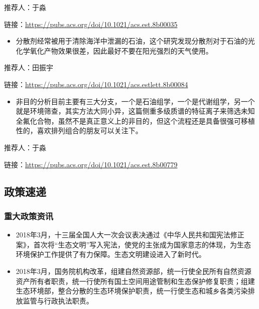 \documentclass[
]{book}
\providecommand{\tightlist}{%
  \setlength{\itemsep}{0pt}\setlength{\parskip}{0pt}}
\begin{document}
推荐人：于淼

链接：\url{https://pubs.acs.org/doi/10.1021/acs.est.8b00035}

\begin{itemize}
\tightlist
\item
  分散剂经常被用于清除海洋中泄漏的石油，这个研究发现分散剂对于石油的光化学氧化产物效果很差，因此最好不要在阳光强烈的天气使用。
\end{itemize}

推荐人：田振宇

链接：\url{https://pubs.acs.org/doi/10.1021/acs.estlett.8b00084}

\begin{itemize}
\tightlist
\item
  非目的分析目前主要有三大分支，一个是石油组学，一个是代谢组学，另一个就是环境筛查，其实方法大同小异，这篇侧重多级质谱的特征离子来筛选未知全氟化合物，虽然不是真正意义上的非目的，但这个流程还是具备很强可移植性的，喜欢排列组合的朋友可以关注下。
\end{itemize}

推荐人：于淼

链接：\url{https://pubs.acs.org/doi/10.1021/acs.est.8b00779}

\hypertarget{ux653fux7b56ux901fux9012}{%
\subsection*{政策速递}\label{ux653fux7b56ux901fux9012}}

\hypertarget{ux91cdux5927ux653fux7b56ux8d44ux8baf}{%
\subsubsection*{重大政策资讯}\label{ux91cdux5927ux653fux7b56ux8d44ux8baf}}

\begin{itemize}
\item
  2018年3月，十三届全国人大一次会议表决通过《中华人民共和国宪法修正案》，首次将``生态文明''写入宪法，使党的主张成为国家意志的体现，为生态环境保护工作提供了有力保障。生态文明建设进入了新时代。
\item
  2018年3月，国务院机构改革，组建自然资源部，统一行使全民所有自然资源资产所有者职责，统一行使所有国土空间用途管制和生态保护修复职责；组建生态环境部，整合分散的生态环境保护职责，统一行使生态和城乡各类污染排放监管与行政执法职责。
\end{itemize}
\end{document}
